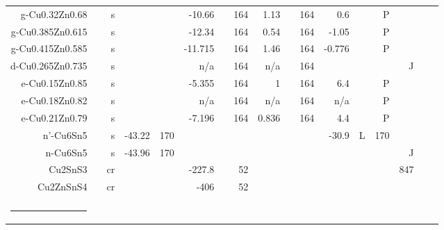 \begin{table}[htbp]
\begin{adjustbox}{width=1\textwidth}
\begin{tabular}{rrrrrrrrrrrrrrrrr}
    g-Cu0.32Zn0.68 &       & s     &       &       & -10.66 &       & 164   & 1.13  &       & 164   & 0.6   &       & P     &       &       &  \\
    g-Cu0.385Zn0.615 &       & s     &       &       & -12.34 &       & 164   & 0.54  &       & 164   & -1.05 &       & P     &       &       &  \\
    g-Cu0.415Zn0.585 &       & s     &       &       & -11.715 &       & 164   & 1.46  &       & 164   & -0.776 &       & P     &       &       &  \\
    d-Cu0.265Zn0.735 &       & s     &       &       & n/a   &       & 164   & n/a   &       & 164   &       &       &       & J     &       &  \\
    e-Cu0.15Zn0.85 &       & s     &       &       & -5.355 &       & 164   & 1     &       & 164   & 6.4   &       & P     &       &       &  \\
    e-Cu0.18Zn0.82 &       & s     &       &       & n/a   &       & 164   & n/a   &       & 164   & n/a   &       & P     &       &       &  \\
    e-Cu0.21Zn0.79 &       & s     &       &       & -7.196 &       & 164   & 0.836 &       & 164   & 4.4   &       & P     &       &       &  \\
    n'-Cu6Sn5 &       & s     & -43.22 & 170   &       &       &       &       &       &       & -30.9 & L     & 170   &       &       &  \\
    n-Cu6Sn5 &       & s     & -43.96 & 170   &       &       &       &       &       &       &       &       &       & J     &       &  \\
    Cu2SnS3 &       & cr    &       &       & -227.8 &       & 52    &       &       &       &       &       &       & 847   &       &  \\
    Cu2ZnSnS4 &       & cr    &       &       & -406  &       & 52    &       &       &       &       &       &       &       &       &  \\
          &       &       &       &       &       &       &       &       &       &       &       &       &       &       &       &  \\
    \hrule
    \end{tabular}%
    \end{adjustbox}
  \label{tab:addlabel}%
\end{table}%
